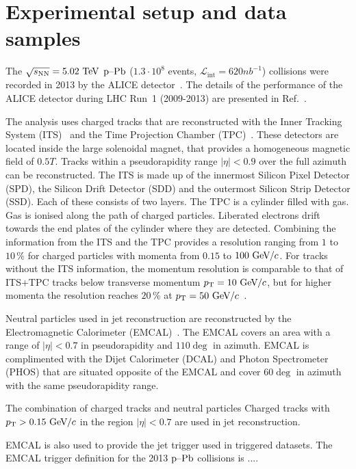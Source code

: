\section{Experimental setup and data samples}
\label{sec:experimentaldetails}
The $\sqrt{s_{\mathrm{NN}}} = 5.02~\mathrm{TeV}$ $\mbox{p--Pb}$ ($1.3 \cdot 10^{8}$ events, $\mathcal{L}_{\mathrm{int}} = \unit{620}{nb^{-1}}$) collisions were recorded in 2013 by the ALICE detector~\cite{aliceDetector}. The details of the performance of the ALICE detector during LHC Run~1 (2009-2013) are presented in Ref.~\cite{alicePerformance}.

The analysis uses charged tracks that are reconstructed with the Inner Tracking System (ITS)~\cite{aliceITS} and the Time Projection Chamber (TPC)~\cite{aliceTPC}. These detectors are located inside the large solenoidal magnet, that provides a homogeneous magnetic field of $\unit{0.5}{T}$. Tracks within a pseudorapidity range $|\eta| < 0.9$ over the full azimuth can be reconstructed. The ITS is made up of the innermost Silicon Pixel Detector (SPD), the Silicon Drift Detector (SDD) and the outermost Silicon Strip Detector (SSD). Each of these consists of two layers. The TPC is a cylinder filled with gas. Gas is ionised along the path of charged particles. Liberated electrons drift towards the end plates of the cylinder where they are detected. Combining the information from the ITS and the TPC provides a resolution ranging from $1$ to $10\,\%$ for charged particles with momenta from $0.15$ to $100~\mathrm{GeV}\kern-0.05em/\kern-0.02em c$. For tracks without the ITS information, the momentum resolution is comparable to that of ITS+TPC tracks below transverse momentum $p_{\rm T} = 10~\mathrm{GeV}\kern-0.05em/\kern-0.02em c$, but for higher momenta the resolution reaches $20\,\%$ at $p_{\rm T} = 50~\mathrm{GeV}\kern-0.05em/\kern-0.02em c$~\cite{alicePerformance,aliceBackgroundFluctuation}. 

Neutral particles used in jet reconstruction are reconstructed by the Electromagnetic Calorimeter (EMCAL)~\cite{aliceEMCAL}. The EMCAL covers an area with a range of $|\eta| < 0.7$  in pseudorapidity and $ 110 \deg $ in azimuth. EMCAL is complimented with the Dijet Calorimeter (DCAL) and Photon Spectrometer (PHOS) that are situated opposite of the EMCAL and cover $ 60 \deg $ in azimuth with the same pseudorapidity range.

The combination of charged tracks and neutral particles 
Charged tracks with  $p_{\rm T} > 0.15~\mathrm{GeV}\kern-0.05em/\kern-0.02em c$ in the region $|\eta| < 0.7$ are used in jet reconstruction.


EMCAL is also used to provide the jet trigger used in triggered datasets. The EMCAL trigger definition for the 2013 $\mbox{p--Pb}$ collisions is .... 

